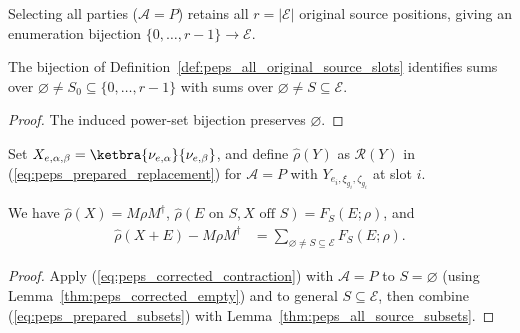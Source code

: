 \begin{definition}
    \label{def:peps_all_original_source_slots}
    \leanok
    Selecting all parties ($\mathcal A=P$) retains all $r=|\mathcal E|$ original
    source positions, giving an enumeration bijection
    $\{0,\ldots,r-1\}\to\mathcal E$.
\end{definition}
\begin{lemma}
    \label{thm:peps_all_source_subsets}
    \leanok
    The bijection of Definition~\ref{def:peps_all_original_source_slots}
    identifies sums over $\varnothing\ne S_0\subseteq\{0,\ldots,r-1\}$ with sums
    over $\varnothing\ne S\subseteq\mathcal E$.
\end{lemma}
\begin{proof}
    \leanok
    The induced power-set bijection preserves $\varnothing$.
\end{proof}

\begin{definition}
    \label{def:peps_global_source_replacement}
    \leanok
    Set $X_{e,\alpha,\beta}=\ketbra{\nu_{e,\alpha}}{\nu_{e,\beta}}$, and define
    $\widehat\rho(Y)$ as $\mathcal R(Y)$ in (\ref{eq:peps_prepared_replacement})
    for $\mathcal A=P$ with $Y_{e_i,\xi_{g_i},\zeta_{g_i}}$ at slot $i$.
\end{definition}
\begin{lemma}
    \label{thm:peps_global_corrected_subsets}
    \leanok
    We have $\widehat\rho(X)=M\rho M^\dagger$,
    $\widehat\rho(E\text{ on }S,X\text{ off }S)=F_S(E;\rho)$, and
    \begin{align}
        \widehat\rho(X+E)-M\rho M^\dagger
         & =\sum_{\varnothing\ne S\subseteq\mathcal E}F_S(E;\rho).
        \label{eq:peps_global_corrected_subsets}
    \end{align}
\end{lemma}
\begin{proof}
    \leanok
    Apply (\ref{eq:peps_corrected_contraction}) with $\mathcal A=P$ to
    $S=\varnothing$ (using Lemma~\ref{thm:peps_corrected_empty}) and to
    general $S\subseteq\mathcal E$, then combine (\ref{eq:peps_prepared_subsets})
    with Lemma~\ref{thm:peps_all_source_subsets}.
\end{proof}

